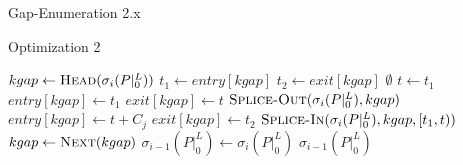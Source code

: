 \documentclass{beamer}
\begin{document}
\begin{section}{Gap-Enumeration 2.x}
\begin{frame}{Optimization 2}
    \begin{algorithm}[H]
    \begin{multicols}{2}
      {\tiny
      \begin{algorithmic}[2]
            \State \begingroup\color{red}$kgap \gets \Call{Head}{\sigma_{i}(P|_{0}^{L})}$\endgroup
            \State $t_{1} \gets entry[kgap]$
            \State $t_{2} \gets exit[kgap]$
                \State \Return $\emptyset$
              \EndIf
                \State $t \gets t_{1}$
              \EndIf
                \begingroup\color{red}
                    \State $entry[kgap] \gets t_{1}$
                    \State $exit[kgap] \gets t$
                  \Else
                    \State $\Call{Splice-Out}{\sigma_{i}(P|_{0}^{L}), kgap}$
                  \EndIf
                    \ExitWhile
                  \EndIf
                \EndIf
                \endgroup
                  \State \begingroup\color{red}$entry[kgap] \gets t + C_{j}$\endgroup
                  \State \begingroup\color{red}$exit[kgap] \gets t_{2}$\endgroup
                    \State \begingroup\color{red}$\Call{Splice-In}{\sigma_{i}(P|_{0}^{L}), kgap, [t_{1},t)}$\endgroup
                  \EndIf
                  \ExitWhile
                \EndIf
              \EndIf
                \State \begingroup\color{red}$kgap \gets \Call{Next}{kgap}$\endgroup
              \EndIf
            \EndWhile
          \EndFor
          \State $\sigma_{i-1}(P|_{0}^{L}) \gets \sigma_{i}(P|_{0}^{L})$
          \State \Return $\sigma_{i-1}(P|_{0}^{L})$
        \EndFunction
      \end{algorithmic}
    }
    \end{multicols}
  \end{algorithm}
\end{frame}


\end{section}
\end{document}
